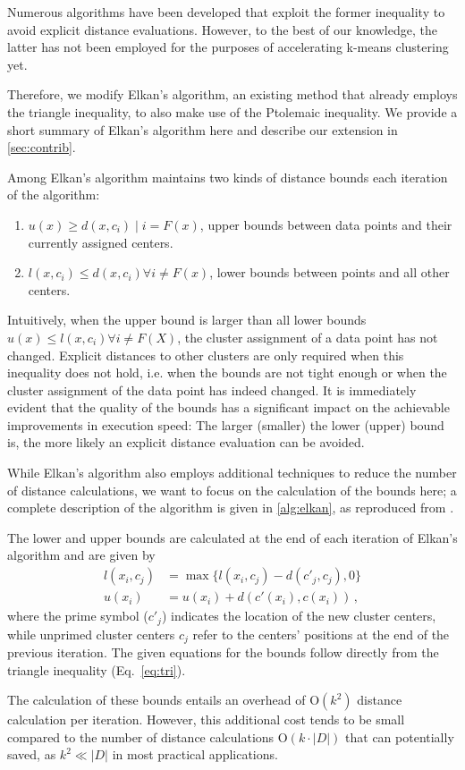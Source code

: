 Numerous algorithms have been developed that exploit the former inequality to avoid explicit distance evaluations. However, to the best of our knowledge, the latter has not been employed for the purposes of accelerating k-means clustering yet.

Therefore, we modify Elkan's algorithm, an existing method that already employs the triangle inequality, to also make use of the Ptolemaic inequality.
We provide a short summary of Elkan's algorithm \cite{DBLP:conf/icml/Elkan03} here and describe our extension in \autoref{sec:contrib}.

Among Elkan's algorithm maintains two kinds of distance bounds each iteration of the algorithm:
\begin{enumerate}[label=\roman*]
	\item $u(x) \geq d(x, c_i) \mid i = F(x)$,
	      upper bounds between data points and their currently assigned centers.
	\item $l(x, c_i) \leq d(x,c_i) \forall i \neq F(x)$,
	      lower bounds between points and all other centers.
\end{enumerate}
Intuitively, when the upper bound is larger than all lower bounds $u(x)\leq l(x,c_i) \forall i\neq F(X)$, the cluster assignment of a data point has not changed.
Explicit distances to other clusters are only required when this inequality does not hold, i.e. when the bounds are not tight enough or when the cluster assignment of the data point has indeed changed.
It is immediately evident that the quality of the bounds has a significant impact on the achievable improvements in execution speed:
The larger (smaller) the lower (upper) bound is, the more likely an explicit distance evaluation can be avoided.

While Elkan's algorithm also employs additional techniques to reduce the number of distance calculations, we want to focus on the calculation of the bounds here;
a complete description of the algorithm is given in \autoref{alg:elkan}, as reproduced from \cite{}.

The lower and upper bounds are calculated at the end of each iteration of Elkan's algorithm and are given by
\begin{align}
	\label{eq:elkan_lower}
	l(x_i, c_j) & = \max \{ l(x_i, c_j) - d(c'_j, c_j), 0 \} \\
	\label{eq:elkan_upper}
	u(x_i)      & = u(x_i) + d(c'(x_i), c(x_i)) \,,
\end{align}
where the prime symbol ($c'_j$) indicates the location of the new cluster centers, while unprimed cluster centers
$c_j$ refer to the centers' positions at the end of the previous iteration.
The given equations for the bounds follow directly from the triangle inequality (Eq.~\ref{eq:tri}).

The calculation of these bounds entails an overhead of $\mathrm{O}(k^2)$ distance calculation per iteration.
However, this additional cost tends to be small compared to the number of distance calculations $\mathrm{O}(k\cdot|D|)$ that can potentially saved,
as  $k^2 \ll |D|$ in most practical applications.



